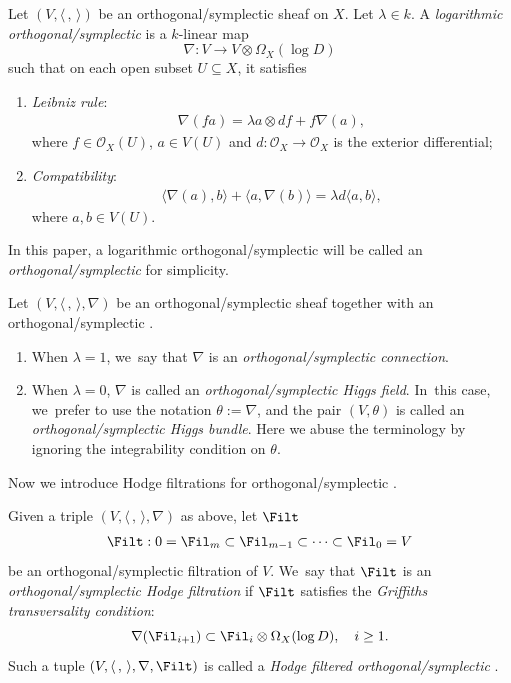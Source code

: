 \begin{defn}\label{defn_lambda_conn}
Let $(V,\langle \,, \, \rangle)$ be an orthogonal/symplectic sheaf on $X$. Let $\lambda\in k$. A \emph{logarithmic orthogonal/symplectic \lconnection} is a $k$-linear map
\[
\nabla: V \to V\otimes \Omega_X(\log D)
\]
such that on each open subset $U \subseteq X$, it satisfies
\begin{enumerate}
\item \emph{Leibniz rule}:\vspace*{-3pt}
\begin{align*}
\nabla (fa)=\lambda a\otimes df+f\nabla(a),
\end{align*}
where $f\in \mathcal{O}_X(U)$, $a \in V(U)$ and $d: \mathcal{O}_X \to \mathcal{O}_X$ is the exterior differential;

\item \emph{Compatibility}:\vspace*{-3pt}
\begin{align*}
\langle \nabla(a),b \rangle+\langle a,\nabla(b) \rangle=\lambda d\langle a,b \rangle,
\end{align*}
where $a,b \in V(U)$.
\end{enumerate}
In this paper, a logarithmic orthogonal/symplectic \lconnection will be called an \emph{orthogonal/symplectic \lconnection} for simplicity.
\end{defn}

\begin{rem}
Let $(V,\langle \,, \, \rangle,\nabla)$ be an orthogonal/symplectic sheaf together with an orthogonal/symplectic \lconnection. 
\begin{enumerate}
\item When $\lambda=1$, we~say that $\nabla$ is an \emph{orthogonal/symplectic connection}.

\item When $\lambda=0$, $\nabla$ is called an \emph{orthogonal/symplectic Higgs field}. In~this case, we~prefer to use the notation $\theta := \nabla$, and the pair $(V,\theta)$ is called an \emph{orthogonal/symplectic Higgs bundle}. Here we abuse the terminology by ignoring the integrability condition on $\theta$.
\end{enumerate}
\end{rem}

Now we introduce Hodge filtrations for orthogonal/symplectic \lconnections.
\begin{defn}\label{defn_na_Hod_fil}
Given a triple $(V,\langle \,, \, \rangle,\nabla)$ as above, let $\Filt$\vspace*{-3pt}
\begin{align*}
\Filt: 0=\Fil_m \subset \Fil_{m-1} \subset \cdots \subset \Fil_0=V
\end{align*}
be an orthogonal/symplectic filtration of $V$. We~say that $\Filt $ is an \emph{orthogonal/sym\-plec\-tic Hodge filtration} if $\Filt $ satisfies the \emph{Griffiths transversality condition}:\vspace*{-3pt}
\[
\nabla(\Fil_{i+1})\subset \Fil_{i}\otimes \Omega_X(\log D), \quad i \geq 1.
\]
Such a tuple $(V, \langle \,, \, \rangle, \nabla, \Filt)$ is called a \emph{Hodge filtered orthogonal/symplectic \lconnection}.
\end{defn}

